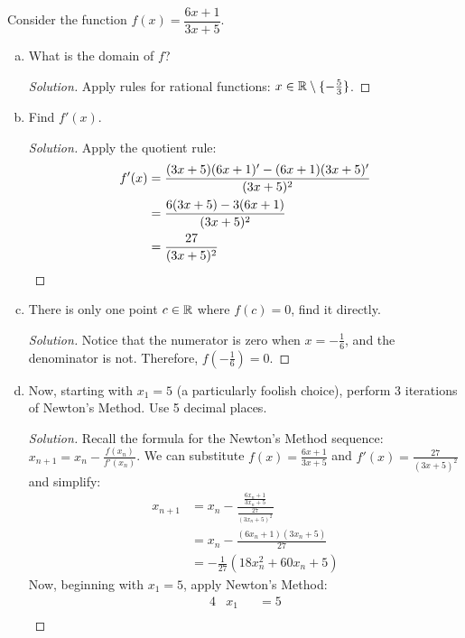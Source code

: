 \question Consider the function $f(x)=\dfrac{6x+1}{3x+5}$.
\begin{enumerate}[(a)]
  \item What is the domain of $f$?
        \begin{proof}[Solution]
          Apply rules for rational functions: $x\in\mathbb{R}\setminus\{-\frac53\}$.
        \end{proof}
  \item Find $f'(x)$.
        \begin{proof}[Solution]
          Apply the quotient rule:
          \begin{align*}
            f'(x) & = \frac{(3x+5)(6x+1)'-(6x+1)(3x+5)'}{(3x+5)^2} \\
                  & = \frac{6(3x+5) - 3(6x+1)}{(3x+5)^2}           \\
                  & = \frac{27}{(3x+5)^2} \qedhere
          \end{align*}
        \end{proof}
  \item There is only one point $c\in\mathbb{R}$ where $f(c) = 0$, find it directly.
        \begin{proof}[Solution]
          Notice that the numerator is zero when $x=-\frac16$, and the denominator is not.
          Therefore, $f(-\frac16)=0$.
        \end{proof}
  \item Now, starting with $x_1=5$ (a particularly foolish choice),
        perform 3 iterations of Newton's Method. Use 5 decimal places.
        \begin{proof}[Solution]
          Recall the formula for the Newton's Method sequence: $x_{n+1} = x_n - \frac{f(x_n)}{f'(x_n)}$.
          We can substitute $f(x) = \frac{6x+1}{3x+5}$ and $f'(x)=\frac{27}{(3x+5)^2}$ and simplify:
          \begin{align*}
            x_{n+1} & = x_n - \frac{\frac{6x_n+1}{3x_n+5}}{\frac{27}{(3x_n+5)^2}} \\
                    & = x_n - \frac{(6x_n+1)(3x_n+5)}{27}                         \\
                    & = -\frac{1}{27}(18x_n^2 + 60x_n + 5)
          \end{align*}
          Now, beginning with $x_1=5$, apply Newton's Method:
          \begin{alignat*}{4}
             & x_1 &  & = 5                                                                                                                                      \\

\end{alignat*}
\end{proof}
\end{enumerate}
